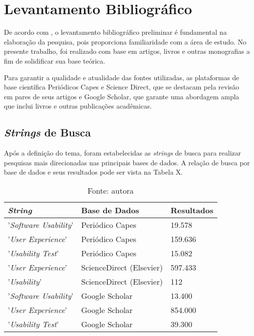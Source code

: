 \section{Levantamento Bibliográfico}
\label{sec:Levantamento Bibliografico}
De acordo com , o levantamento bibliográfico preliminar é fundamental na elaboração da pesquisa, pois proporciona familiaridade com a área de estudo. No presente trabalho, foi realizado com base em artigos, livros e outras monografias a fim de solidificar sua base teórica.

Para garantir a qualidade e atualidade das fontes utilizadas, as plataformas de base científica Periódicos Capes e Science Direct, que se destacam pela revisão em pares de seus artigos e Google Scholar, que garante uma abordagem ampla que inclui livros e outras publicações acadêmicas. 

\subsection{\textit{Strings} de Busca}
\label{sec:Strings de Busca}
Após a definição do tema, foram estabelecidas as \textit{strings} de busca para realizar pesquisas mais direcionadas nas principais bases de dados. A relação de busca por base de dados e seus resultados pode ser vista na Tabela X.

\begin{table}[h]
	\centering
	\caption{Fonte: autora}
	\begin{tabular}{l|l|l}
	\hline
	\textit{String}               & Base de Dados            & Resultados \\ \hline
	'\textit{Software Usability}' & Periódico Capes          & 19.578     \\ \hline
	'\textit{User Experience}'    & Periódico Capes          & 159.636    \\ \hline
	'\textit{Usability Test}'     & Periódico Capes          & 15.082     \\ \hline
	'\textit{User Experience}'    & ScienceDirect (Elsevier) & 597.433    \\ \hline
	'\textit{Usability}'          & ScienceDirect (Elsevier) & 112        \\ \hline
	'\textit{Software Usability}' & Google Scholar           & 13.400     \\ \hline
	'\textit{User Experience}'    & Google Scholar           & 854.000    \\ \hline
	'\textit{Usability Test}'     & Google Scholar           & 39.300     \\ \hline
	\end{tabular}
\end{table}

